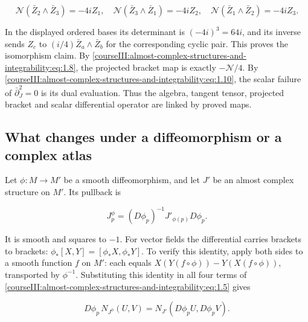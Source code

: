 \begin{equation}
\mathscr N(\bar Z_2\wedge\bar Z_3)=-4iZ_1,
\quad \mathscr N(\bar Z_3\wedge\bar Z_1)=-4iZ_2,
\quad \mathscr N(\bar Z_1\wedge\bar Z_2)=-4iZ_3.
\label{courseIII:almost-complex-structures-and-integrability:eq:4.12}
\end{equation}

In the displayed ordered bases its determinant is \((-4i)^3=64i\), and its inverse sends \(Z_c\) to \((i/4)\bar Z_a\wedge\bar Z_b\) for the corresponding cyclic pair. This proves the isomorphism claim. By \eqref{courseIII:almost-complex-structures-and-integrability:eq:1.8}, the projected bracket map is exactly \(-\mathscr N/4\). By \eqref{courseIII:almost-complex-structures-and-integrability:eq:1.10}, the scalar failure of \(\bar\partial_J^2=0\) is its dual evaluation. Thus the algebra, tangent tensor, projected bracket and scalar differential operator are linked by proved maps.

\subsection{What changes under a diffeomorphism or a complex atlas}
\label{courseIII:almost-complex-structures-and-integrability:transport-of-structures}

\label{courseIII:almost-complex-structures-and-integrability:section-5}

Let \(\phi:M\to M'\) be a smooth diffeomorphism, and let \(J'\) be an almost complex structure on \(M'\). Its pullback is

\begin{equation}
J^\phi_p=(D\phi_p)^{-1}J'_{\phi(p)}D\phi_p.
\label{courseIII:almost-complex-structures-and-integrability:eq:5.1}
\end{equation}

It is smooth and squares to \(-1\). For vector fields the differential carries brackets to brackets:
\(\phi_*[X,Y]=[\phi_*X,\phi_*Y]\).
To verify this identity, apply both sides to a smooth function \(f\) on \(M'\): each equals \(X(Y(f\circ\phi))-Y(X(f\circ\phi))\), transported by \(\phi^{-1}\). Substituting this identity in all four terms of \eqref{courseIII:almost-complex-structures-and-integrability:eq:1.5} gives

\begin{equation}
D\phi_p\,N_{J^\phi}(U,V)
=N_{J'}(D\phi_pU,D\phi_pV).
\label{courseIII:almost-complex-structures-and-integrability:eq:5.2}
\end{equation}

